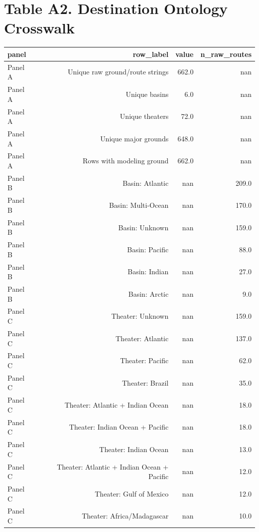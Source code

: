 \documentclass{article}
\begin{document}
\section*{Table A2. Destination Ontology Crosswalk}
\begin{tabular}{lrrr}
\hline
panel & row_label & value & n_raw_routes \\
\hline
Panel A & Unique raw ground/route strings & 662.0 & nan \\
Panel A & Unique basins & 6.0 & nan \\
Panel A & Unique theaters & 72.0 & nan \\
Panel A & Unique major grounds & 648.0 & nan \\
Panel A & Rows with modeling ground & 662.0 & nan \\
Panel B & Basin: Atlantic & nan & 209.0 \\
Panel B & Basin: Multi-Ocean & nan & 170.0 \\
Panel B & Basin: Unknown & nan & 159.0 \\
Panel B & Basin: Pacific & nan & 88.0 \\
Panel B & Basin: Indian & nan & 27.0 \\
Panel B & Basin: Arctic & nan & 9.0 \\
Panel C & Theater: Unknown & nan & 159.0 \\
Panel C & Theater: Atlantic & nan & 137.0 \\
Panel C & Theater: Pacific & nan & 62.0 \\
Panel C & Theater: Brazil & nan & 35.0 \\
Panel C & Theater: Atlantic + Indian Ocean & nan & 18.0 \\
Panel C & Theater: Indian Ocean + Pacific & nan & 18.0 \\
Panel C & Theater: Indian Ocean & nan & 13.0 \\
Panel C & Theater: Atlantic + Indian Ocean + Pacific & nan & 12.0 \\
Panel C & Theater: Gulf of Mexico & nan & 12.0 \\
Panel C & Theater: Africa/Madagascar & nan & 10.0 \\
\hline
\end{tabular}
\end{document}
